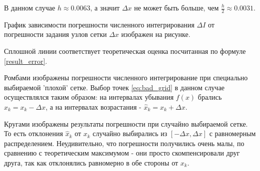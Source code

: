 \documentclass[10pt, twocolumn]{article}
\begin{document}
В данном случае $h \approx 0.0063$, а значит $\Delta x$ не может быть больше, чем $\frac{h}{2} \approx 0.0031$.

График зависимости погрешности численного интегрирования $\Delta I$ от погрешности задания узлов сетки $\Delta x$ изображен на рисунке.

Сплошной линии соответствует теоретическая оценка посчитанная по формуле \eqref{result_error}.

Ромбами изображены погрешности численного интегрирование при специально выбираемой 'плохой' сетке.
Выбор точек \eqref{eq:bad_grid} в данном случае осуществлялся таким образом: на интервалах убывания $f(x)$ брались $\hat{x}_k = x_k - \Delta x$, а на интервалах возрастания - $\hat{x}_k = x_k + \Delta x$.

Кругами изображены результаты погрешности при случайно выбираемой сетке. То есть отклонения $\hat{x}_k$ от $x_k$ случайно выбирались из $[-\Delta x, \Delta x]$ с равномерным распределением. Неудивительно, что погрешности получились очень малы, по сравнению с теоретическим максимумом - они просто скомпенсировали друг друга, так как отклонялись равномерно в обе стороны от $x_k$.
\end{document}
